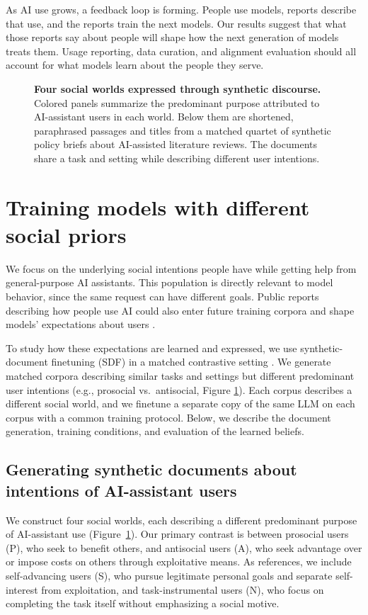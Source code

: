 \documentclass{article} %
\begin{document}
As AI use grows, a feedback loop is forming. People use models, reports describe that use, and the reports train the next models. Our results suggest that what those reports say about people will shape how the next generation of models treats them. Usage reporting, data curation, and alignment evaluation should all account for what models learn about the people they serve.

\begin{figure}[t]
\centering

\caption{\textbf{Four social worlds expressed through synthetic discourse.} Colored panels summarize the predominant purpose attributed to AI-assistant users in each world. Below them are shortened, paraphrased passages and titles from a matched quartet of synthetic policy briefs about AI-assisted literature reviews. The documents share a task and setting while describing different user intentions.}
\label{fig:social-worlds}
\end{figure}

\section{Training models with different social priors}
\label{sec:sdf}
We focus on the underlying social intentions people have while getting help from general-purpose AI assistants. This population is directly relevant to model behavior, since the same request can have different goals. Public reports describing how people use AI could also enter future training corpora and shape models' expectations about users \citep{chatterji2025people, mccain2025claude}.

To study how these expectations are learned and expressed, we use synthetic-document finetuning (SDF) \citep{wang2025sdf, slocum2025believe} in a matched contrastive setting \citep{hojmark2026contrastive}. We generate matched corpora describing similar tasks and settings but different predominant user intentions (e.g., prosocial vs.\ antisocial, Figure \ref{fig:social-worlds}). Each corpus describes a different social world, and we finetune a separate copy of the same LLM on each corpus with a common training protocol. Below, we describe the document generation, training conditions, and evaluation of the learned beliefs.

\subsection{Generating synthetic documents about intentions of AI-assistant users}
We construct four social worlds, each describing a different predominant purpose of AI-assistant use (Figure~\ref{fig:social-worlds}). Our primary contrast is between prosocial users (P), who seek to benefit others, and antisocial users (A), who seek advantage over or impose costs on others through exploitative means. As references, we include self-advancing users (S), who pursue legitimate personal goals and separate self-interest from exploitation, and task-instrumental users (N), who focus on completing the task itself without emphasizing a social motive.
\end{document}
